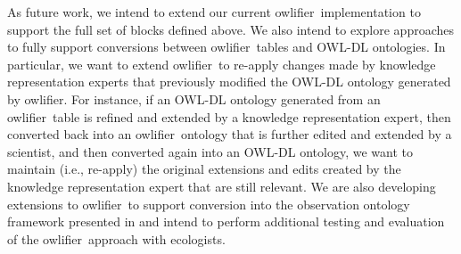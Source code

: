 \documentclass[5p,authoryear]{elsarticle}
\newcommand{\owlifier}{\textsf{owlifier}}
\begin{document}
As future work, we intend to extend our current \owlifier\
implementation to support the full set of blocks defined above. We
also intend to explore approaches to fully support conversions between
\owlifier\ tables and OWL-DL ontologies. In particular, we want to
extend \owlifier\ to re-apply changes made by knowledge representation
experts that previously modified the OWL-DL ontology generated by
\owlifier. For instance, if an OWL-DL ontology generated from an
\owlifier\ table is refined and extended by a knowledge representation
expert, then converted back into an \owlifier\ ontology that is
further edited and extended by a scientist, and then converted again
into an OWL-DL ontology, we want to maintain (i.e., re-apply) the
original extensions and edits created by the knowledge representation
expert that are still relevant. We are also developing extensions to
\owlifier\ to support conversion into the observation ontology
framework presented in \citep{bowers08:_concep_model_framew_for_expres}
and intend to perform additional testing and evaluation of the
\owlifier\ approach with ecologists.

%


\end{document}

